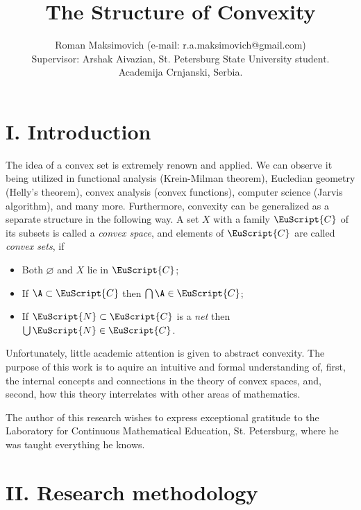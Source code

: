 \documentclass[conference]{IEEEtran}
\newcommand{\C}{\EuScript{C}}
\newcommand{\Nee}{\EuScript{N}}
\begin{document}
\title{The Structure of Convexity} 
\date{}%

\author{
Roman Maksimovich (e-mail: r.a.maksimovich@gmail.com) \\
Supervisor: Arshak Aivazian, St. Petersburg State University student.\\ Academija Crnjanski, Serbia.
}
\maketitle


\section*{\Large{I. Introduction }}

The idea of a convex set is extremely renown and applied. We can observe it being utilized in functional analysis (Krein-Milman theorem), Eucledian geometry (Helly's theorem), convex analysis (convex functions), computer science (Jarvis algorithm), and many more. Furthermore, convexity can be generalized as a separate structure in the following way. A set \(X\) with a family \(\C\) of its subsets is called a \textit{convex space}, and elements of \(\C\) are called \textit{convex sets}, if

\begin{itemize}
    \item Both \(\varnothing\) and \(X\) lie in \(\C\);
    \item If \(\A \subset \C\) then \(\bigcap \A \in \C\);
    \item If \(\Nee \subset \C\) is a \textit{net} then \(\bigcup \Nee \in \C\).
\end{itemize}

Unfortunately, little academic attention is given to abstract convexity. The purpose of this work is to aquire an intuitive and formal understanding of, first, the internal concepts and connections in the theory of convex spaces, and, second, how this theory interrelates with other areas of mathematics.

The author of this research wishes to express exceptional gratitude to the Laboratory for Continuous Mathematical Education, St. Petersburg, where he was taught everything he knows.

\section*{\Large{II. Research methodology}}
\end{document}
